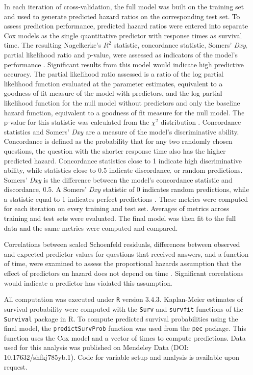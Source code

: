 \documentclass[]{interact}\usepackage[]{graphicx}\usepackage[]{color}
\begin{document}
{In each iteration of cross-validation, the full model was built on the training set and used to generate predicted hazard ratios on the corresponding test set. To assess prediction performance, predicted hazard ratios were entered into separate Cox models as the single quantitative predictor with response times as survival time. The resulting Nagelkerke's $R^2$ statistic, concordance statistic, Somers' \textit{Dxy}, partial likelihood ratio and p-value, were assessed as indicators of the model's performance \citep{Chen}. Significant results from this model would indicate high predictive accuracy. The partial likelihood ratio assessed is a ratio of the log partial likelihood function evaluated at the parameter estimates, equivalent to a goodness of fit measure of the model with predictors, and the log partial likelihood function for the null model without predictors and only the baseline hazard function, equivalent to a goodness of fit measure for the null model. The p-value for this statistic was calculated from the $\chi^2$ distribution \citep{Oakes1981}. Concordance statistics and Somers' \textit{Dxy} are a measure of the model's discriminative ability. Concordance is defined as the probability that for any two randomly chosen questions, the question with the shorter response time also has the higher predicted hazard. Concordance statistics close to 1 indicate high discriminative ability, while statistics close to 0.5 indicate discordance, or random predictions. Somers' \textit{Dxy} is the difference between the model's concordance statistic and discordance, 0.5. A Somers' \textit{Dxy} statistic of 0 indicates random predictions, while a statistic equal to 1 indicates perfect predictions \citep{Harrell2015}. These metrics were computed for each iteration on every training and test set. Averages of metrics across training and test sets were evaluated. The final model was then fit to the full data and the same metrics were computed and compared. 

Correlations between scaled Schoenfeld residuals, differences between observed and expected predictor values for questions that received answers, and a function of time, were examined to assess the proportional hazards assumption that the effect of predictors on hazard does not depend on time \citep{Grambsch1994}. Significant correlations would indicate a predictor has violated this assumption.

All computation was executed under \texttt{R} version 3.4.3.  Kaplan-Meier estimates of survival probability were computed with the \texttt{Surv} and \texttt{survfit} functions of the \texttt{Survival} package in R. To compute predicted survival probabilities using the final model, the \texttt{predictSurvProb} function was used from the \texttt{pec} package. This function uses the Cox model and a vector of times to compute predictions. Data used for this analysis was published on Mendeley Data (DOI: 10.17632/shfkj785yb.1). Code for variable setup and analysis is available upon request. 


}
\end{document}
